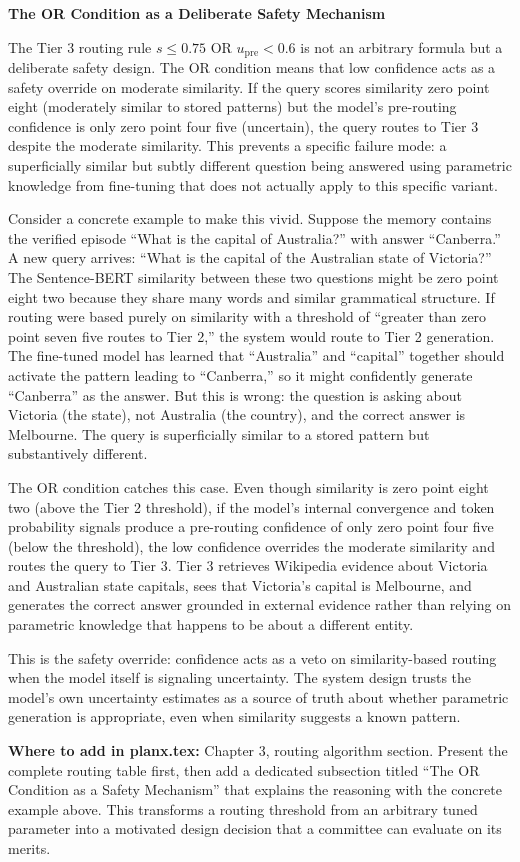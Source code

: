 \documentclass[11pt,a4paper]{article}
\newcommand{\upre}{u_{\text{pre}}}
\begin{document}
{\textbf{The OR Condition as a Deliberate Safety Mechanism}

The Tier 3 routing rule $s \leq 0.75$ OR $\upre < 0.6$ is not an arbitrary formula but a deliberate safety design. The OR condition means that low confidence acts as a safety override on moderate similarity. If the query scores similarity zero point eight (moderately similar to stored patterns) but the model's pre-routing confidence is only zero point four five (uncertain), the query routes to Tier 3 despite the moderate similarity. This prevents a specific failure mode: a superficially similar but subtly different question being answered using parametric knowledge from fine-tuning that does not actually apply to this specific variant.

Consider a concrete example to make this vivid. Suppose the memory contains the verified episode ``What is the capital of Australia?'' with answer ``Canberra.'' A new query arrives: ``What is the capital of the Australian state of Victoria?'' The Sentence-BERT similarity between these two questions might be zero point eight two because they share many words and similar grammatical structure. If routing were based purely on similarity with a threshold of ``greater than zero point seven five routes to Tier 2,'' the system would route to Tier 2 generation. The fine-tuned model has learned that ``Australia'' and ``capital'' together should activate the pattern leading to ``Canberra,'' so it might confidently generate ``Canberra'' as the answer. But this is wrong: the question is asking about Victoria (the state), not Australia (the country), and the correct answer is Melbourne. The query is superficially similar to a stored pattern but substantively different.

The OR condition catches this case. Even though similarity is zero point eight two (above the Tier 2 threshold), if the model's internal convergence and token probability signals produce a pre-routing confidence of only zero point four five (below the threshold), the low confidence overrides the moderate similarity and routes the query to Tier 3. Tier 3 retrieves Wikipedia evidence about Victoria and Australian state capitals, sees that Victoria's capital is Melbourne, and generates the correct answer grounded in external evidence rather than relying on parametric knowledge that happens to be about a different entity.

This is the safety override: confidence acts as a veto on similarity-based routing when the model itself is signaling uncertainty. The system design trusts the model's own uncertainty estimates as a source of truth about whether parametric generation is appropriate, even when similarity suggests a known pattern.

\textbf{Where to add in planx.tex:} Chapter 3, routing algorithm section. Present the complete routing table first, then add a dedicated subsection titled ``The OR Condition as a Safety Mechanism'' that explains the reasoning with the concrete example above. This transforms a routing threshold from an arbitrary tuned parameter into a motivated design decision that a committee can evaluate on its merits.
}
\end{document}
